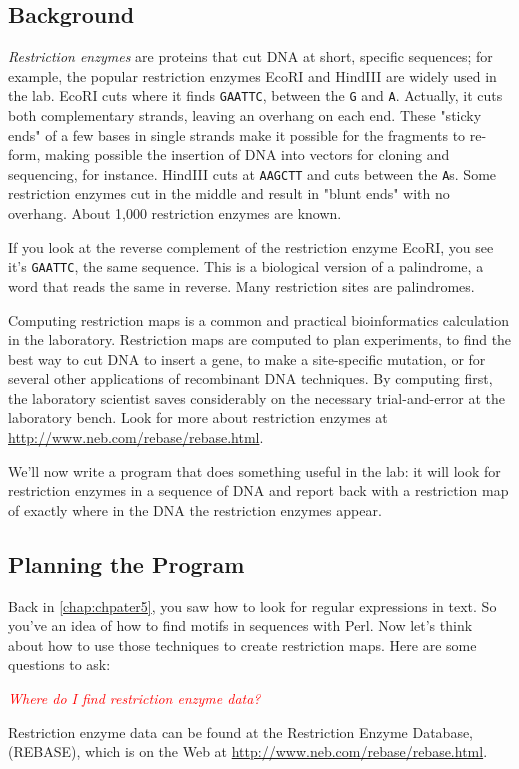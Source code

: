\subsection{Background}
\textit{Restriction enzymes} are proteins that cut DNA at short, specific sequences; for example, the popular restriction enzymes EcoRI and HindIII are widely used in the lab. EcoRI cuts where it finds \verb|GAATTC|, between the \verb|G| and \verb|A|. Actually, it cuts both complementary strands, leaving an overhang on each end. These "sticky ends" of a few bases in single strands make it possible for the fragments to re-form, making possible the insertion of DNA into vectors for cloning and sequencing, for instance. HindIII cuts at \verb|AAGCTT| and cuts between the \verb|A|s. Some restriction enzymes cut in the middle and result in "blunt ends" with no overhang. About 1,000 restriction enzymes are known. 

If you look at the reverse complement of the restriction enzyme EcoRI, you see it's \verb|GAATTC|, the same sequence. This is a biological version of a palindrome, a word that reads the same in reverse. Many restriction sites are palindromes.

Computing restriction maps is a common and practical bioinformatics calculation in the laboratory. Restriction maps are computed to plan experiments, to find the best way to cut DNA to insert a gene, to make a site-specific mutation, or for several other applications of recombinant DNA techniques. By computing first, the laboratory scientist saves considerably on the necessary trial-and-error at the laboratory bench.  Look for more about restriction enzymes at \href{http://www.neb.com/rebase/rebase.html}{http://www.neb.com/rebase/rebase.html}.

We'll now write a program that does something useful in the lab: it will look for restriction enzymes in a sequence of DNA and report back with a restriction map of exactly where in the DNA the restriction enzymes appear. 

\subsection{Planning the Program}
Back in \autoref{chap:chpater5}, you saw how to look for regular expressions in text.  So you've an idea of how to find motifs in sequences with Perl. Now let's think about how to use those techniques to create restriction maps. Here are some questions to ask:

\textcolor{red}{\textit{Where do I find restriction enzyme data?}}
\begin{adjustwidth}{1cm}{}
Restriction enzyme data can be found at the Restriction Enzyme Database, (REBASE), which is on the Web at \href{http://www.neb.com/rebase/rebase.html}{http://www.neb.com/rebase/rebase.html}.
\end{adjustwidth}


